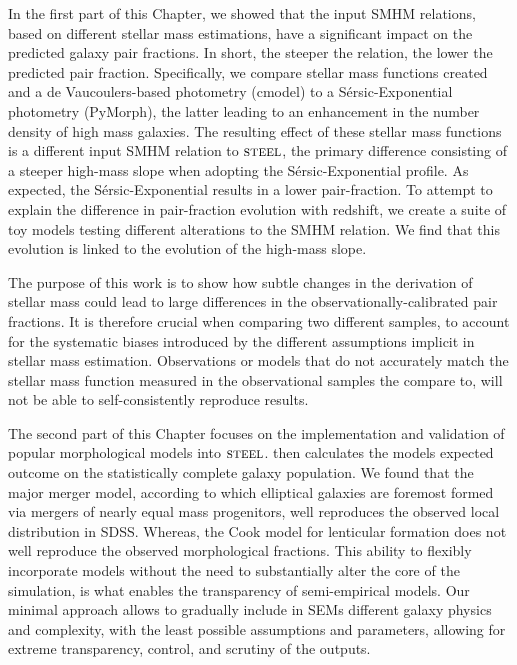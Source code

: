 In the first part of this Chapter, we showed that the input SMHM relations, based on different stellar mass estimations, have a significant impact on the predicted galaxy pair fractions. In short, the steeper the relation, the lower the predicted pair fraction. Specifically, we compare stellar mass functions created and a de Vaucoulers-based photometry (cmodel) to a S\'ersic-Exponential photometry (PyMorph), the latter leading to an enhancement in the number density of high mass galaxies. The resulting effect of these stellar mass functions is a different input SMHM relation to $\textsc{steel}$, the primary difference consisting of a steeper high-mass slope when adopting the S\'ersic-Exponential profile. As expected, the S\'ersic-Exponential results in a lower pair-fraction. To attempt to explain the difference in pair-fraction evolution with redshift, we create a suite of toy models testing different alterations to the SMHM relation. We find that this evolution is linked to the evolution of the high-mass slope.

The purpose of this work is to show how subtle changes in the derivation of stellar mass could lead to large differences in the observationally-calibrated pair fractions. It is therefore crucial when comparing two different samples, to account for the systematic biases introduced by the different assumptions implicit in stellar mass estimation. Observations or models that do not accurately match the stellar mass function measured in the observational samples the compare to, will not be able to self-consistently reproduce results.

The second part of this Chapter focuses on the implementation and validation of popular morphological models into $\textsc{steel}$. \steel then calculates the models expected outcome on the statistically complete galaxy population. We found that the major merger model, according to which elliptical galaxies are foremost formed via mergers of nearly equal mass progenitors, well reproduces the observed local distribution in SDSS. Whereas, the Cook model for lenticular formation does not well reproduce the observed morphological fractions. This ability to flexibly incorporate models without the need to substantially alter the core of the simulation, is what enables the transparency of semi-empirical models. Our minimal approach allows to gradually include in SEMs different galaxy physics and complexity, with the least possible assumptions and parameters, allowing for extreme transparency, control, and scrutiny of the outputs.

